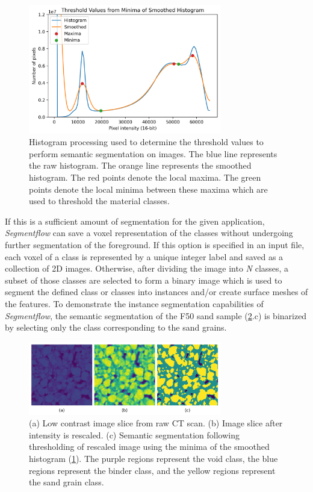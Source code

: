 \begin{figure}[ht]
    \centering
    \includegraphics[width=0.75\textwidth]{figures/06/01-multi-min-hist.png}
    \caption{
        \small{}
        Histogram processing used to determine the threshold values to
        perform semantic segmentation on images. The blue line represents the
        raw histogram. The orange line represents the smoothed histogram.
        The red points denote the local maxima. The green points denote
        the local minima between these maxima which are used to threshold the
        material classes.
    }
    \label{fig/06/thresh}
\end{figure}

If this is a sufficient amount of segmentation
for the given application, \textit{Segmentflow}
can save a voxel representation of
the classes without undergoing further segmentation of the foreground. If
this option is specified in an input file, each voxel of a class is
represented by a unique integer label and saved as a collection of 2D
images. Otherwise, after dividing the image into \textit{N} classes, a
subset of those classes are selected to form a binary image which is used
to segment the defined class or classes into instances and/or
create surface meshes of the features. To demonstrate the instance
segmentation capabilities of \textit{Segmentflow}, the semantic
segmentation of the F50 sand sample (\ref{fig/06/semantic}.c) is
binarized by selecting only the class corresponding to the sand grains.

\begin{figure}[ht]
    \centering
    \includegraphics[width=0.75\textwidth]{figures/06/02-slice-525-semantic.png}
    \caption{
        \small{}
        (a) Low contrast image slice from raw CT scan.
        (b) Image slice after intensity is rescaled.
        (c) Semantic segmentation following thresholding of rescaled image
        using the minima of the smoothed histogram
        (\ref{fig/06/thresh}). The purple regions represent the
        void class, the blue regions represent the binder class, and the
        yellow regions represent the sand grain class.
    }
    \label{fig/06/semantic}
\end{figure}

